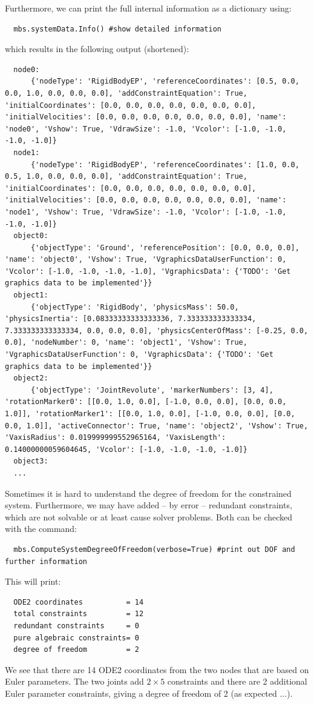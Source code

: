 \noindent Furthermore, we can print the full internal information as a dictionary using:
\pythonstyle\begin{lstlisting}
  mbs.systemData.Info() #show detailed information
\end{lstlisting}
which results in the following output (shortened):
\plainlststyle
\begin{lstlisting}
  node0:
      {'nodeType': 'RigidBodyEP', 'referenceCoordinates': [0.5, 0.0, 0.0, 1.0, 0.0, 0.0, 0.0], 'addConstraintEquation': True, 'initialCoordinates': [0.0, 0.0, 0.0, 0.0, 0.0, 0.0, 0.0], 'initialVelocities': [0.0, 0.0, 0.0, 0.0, 0.0, 0.0, 0.0], 'name': 'node0', 'Vshow': True, 'VdrawSize': -1.0, 'Vcolor': [-1.0, -1.0, -1.0, -1.0]}
  node1:
      {'nodeType': 'RigidBodyEP', 'referenceCoordinates': [1.0, 0.0, 0.5, 1.0, 0.0, 0.0, 0.0], 'addConstraintEquation': True, 'initialCoordinates': [0.0, 0.0, 0.0, 0.0, 0.0, 0.0, 0.0], 'initialVelocities': [0.0, 0.0, 0.0, 0.0, 0.0, 0.0, 0.0], 'name': 'node1', 'Vshow': True, 'VdrawSize': -1.0, 'Vcolor': [-1.0, -1.0, -1.0, -1.0]}
  object0:
      {'objectType': 'Ground', 'referencePosition': [0.0, 0.0, 0.0], 'name': 'object0', 'Vshow': True, 'VgraphicsDataUserFunction': 0, 'Vcolor': [-1.0, -1.0, -1.0, -1.0], 'VgraphicsData': {'TODO': 'Get graphics data to be implemented'}}
  object1:
      {'objectType': 'RigidBody', 'physicsMass': 50.0, 'physicsInertia': [0.08333333333333336, 7.333333333333334, 7.333333333333334, 0.0, 0.0, 0.0], 'physicsCenterOfMass': [-0.25, 0.0, 0.0], 'nodeNumber': 0, 'name': 'object1', 'Vshow': True, 'VgraphicsDataUserFunction': 0, 'VgraphicsData': {'TODO': 'Get graphics data to be implemented'}}
  object2:
      {'objectType': 'JointRevolute', 'markerNumbers': [3, 4], 'rotationMarker0': [[0.0, 1.0, 0.0], [-1.0, 0.0, 0.0], [0.0, 0.0, 1.0]], 'rotationMarker1': [[0.0, 1.0, 0.0], [-1.0, 0.0, 0.0], [0.0, 0.0, 1.0]], 'activeConnector': True, 'name': 'object2', 'Vshow': True, 'VaxisRadius': 0.019999999552965164, 'VaxisLength': 0.14000000059604645, 'Vcolor': [-1.0, -1.0, -1.0, -1.0]}
  object3:
  ...
\end{lstlisting}

\noindent Sometimes it is hard to understand the degree of freedom for the constrained system. Furthermore, we may have added -- by error --
redundant constraints, which are not solvable or at least cause solver problems. Both can be checked with the command:
\pythonstyle\begin{lstlisting}
  mbs.ComputeSystemDegreeOfFreedom(verbose=True) #print out DOF and further information
\end{lstlisting}
This will print:
\begin{lstlisting}
  ODE2 coordinates          = 14
  total constraints         = 12
  redundant constraints     = 0
  pure algebraic constraints= 0
  degree of freedom         = 2
\end{lstlisting}
We see that there are 14 ODE2 coordinates from the two nodes that are based on Euler parameters. The two joints add $2\times 5$ constraints and there are 2 additional Euler parameter constraints, giving a degree of freedom of 2 (as expected ...).

